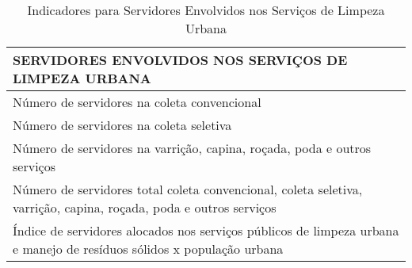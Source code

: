 \begin{table}[h!]
  \centering
  \caption{Indicadores para Servidores Envolvidos nos Serviços de Limpeza Urbana}
    \begin{tabular}{|p{27em}|}
    \toprule
    \rowcolor[rgb]{ .773,  .878,  .702} SERVIDORES ENVOLVIDOS NOS SERVIÇOS DE LIMPEZA URBANA \\
    \midrule
    Número de servidores na coleta convencional \\
    \midrule
    Número de servidores na coleta seletiva \\
    \midrule
    Número de servidores na varrição, capina, roçada, poda e outros serviços \\
    \midrule
    Número de servidores total coleta convencional, coleta seletiva, varrição, capina, roçada, poda e outros serviços \\
    \midrule
    Índice de servidores alocados nos serviços públicos de limpeza urbana e manejo de resíduos sólidos x população urbana \\
    \bottomrule
    \end{tabular}%
  \label{tab:ind_servidores_slu}%
\end{table}%
